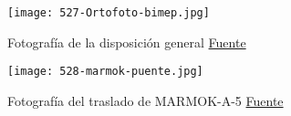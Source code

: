 \begin{figure}
\centering
\texttt{[image: 527-Ortofoto-bimep.jpg]}
\caption[Fotografía de la disposición general]{Fotografía de la disposición general \href{http://bimep.com/sobre-bimep/localizacion-de-bimep/}{Fuente}}
\label{fig:Ortofoto-bimep}
\end{figure}

\begin{figure}
\centering
\texttt{[image: 528-marmok-puente.jpg]}
\caption[Fotografía del traslado de MARMOK-A-5]{Fotografía del traslado de MARMOK-A-5 \href{https://www.tecnalia.com/es/energia-medioambiente/noticias/oceantec-instala-en-bimep-su-primer-dispositivo-para-el-aprovechamiento-de-la-energia-de-las-olas.htm}{Fuente}}
\label{fig:marmok-puente}
\end{figure}

